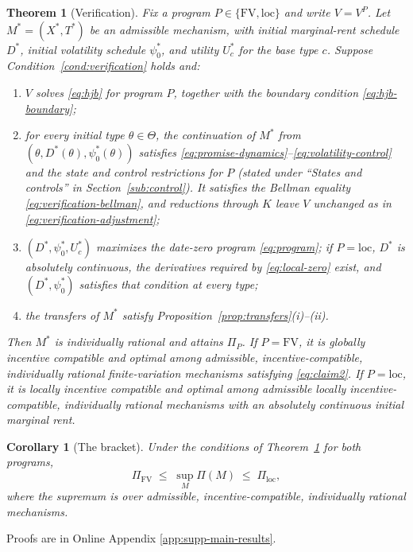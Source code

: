 \documentclass[12pt]{article}
\newtheorem{theorem}{Theorem}
\newtheorem{corollary}{Corollary}[theorem]
\begin{document}
\begin{theorem}[Verification]\label{thm:control}
Fix a program \(P\in\{\mathrm{FV},\mathrm{loc}\}\) and write
\(V=V^P\). Let \(M^*=(X^*,T^*)\) be an admissible mechanism,
with initial marginal-rent schedule \(D^*\), initial volatility
schedule \(\psi_0^*\), and utility \(U_c^*\) for the base type \(c\).
Suppose Condition~\ref{cond:verification} holds and:
\begin{enumerate}[beginpenalty=10000]

\item[\textnormal{(i)}]
\(V\) solves \eqref{eq:hjb} for program \(P\), together with
the boundary condition \eqref{eq:hjb-boundary};

\item[\textnormal{(ii)}]
for every initial type \(\theta\in\Theta\), the continuation
of \(M^*\) from \((\theta,D^*(\theta),\psi_0^*(\theta))\)
satisfies \eqref{eq:promise-dynamics}--\eqref{eq:volatility-control}
and the state and control restrictions for \(P\) (stated under
``States and controls'' in Section~\ref{sub:control}).
It satisfies the Bellman equality \eqref{eq:verification-bellman},
and reductions through \(K\) leave \(V\) unchanged as in
\eqref{eq:verification-adjustment};

\item[\textnormal{(iii)}]
\((D^*,\psi_0^*,U_c^*)\) maximizes the date-zero program
\eqref{eq:program}; if \(P=\mathrm{loc}\), \(D^*\) is absolutely
continuous, the derivatives required by \eqref{eq:local-zero}
exist, and \((D^*,\psi_0^*)\) satisfies that condition at every type;

\item[\textnormal{(iv)}]
the transfers of \(M^*\) satisfy
Proposition~\ref{prop:transfers}\textnormal{(i)--(ii)}.

\end{enumerate}
Then \(M^*\) is individually rational and attains \(\Pi_P\).
If \(P=\mathrm{FV}\), it is globally incentive compatible and
optimal among admissible, incentive-compatible, individually
rational finite-variation mechanisms satisfying \eqref{eq:claim2}.
If \(P=\mathrm{loc}\), it is locally incentive compatible and
optimal among admissible locally incentive-compatible,
individually rational mechanisms with an absolutely continuous
initial marginal rent.
\end{theorem}
\begin{corollary}[The bracket]\label{cor:bracket}
Under the conditions of Theorem~\ref{thm:control} for both programs,
\[
  \Pi_{\mathrm{FV}}
  \;\leq\;
  \sup_M\Pi(M)
  \;\leq\;
  \Pi_{\mathrm{loc}},
\]
where the supremum is over admissible, incentive-compatible,
individually rational mechanisms.
\end{corollary}
Proofs are in Online Appendix \ref{app:supp-main-results}.
\end{document}
